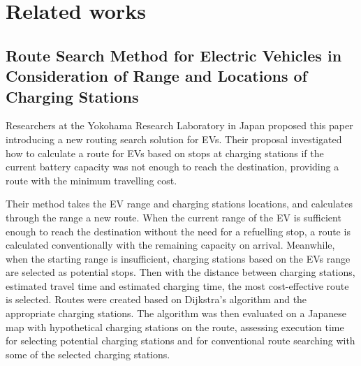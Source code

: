 \documentclass[11pt]{report}
\begin{document}
\section{Related works}

\subsection{Route Search Method for Electric Vehicles in Consideration of Range and Locations of Charging Stations \autocite{kobayashi2011route}}

Researchers at the Yokohama Research Laboratory in Japan proposed this paper introducing a new routing search solution for EVs. Their proposal investigated how to calculate a route for EVs based on stops at charging stations if the current battery capacity was not enough to reach the destination, providing a route with the minimum travelling cost.

Their method takes the EV range and charging stations locations, and calculates through the range a new route. When the current range of the EV is sufficient enough to reach the destination without the need for a refuelling stop, a route is calculated conventionally with the remaining capacity on arrival. Meanwhile, when the starting range is insufficient, charging stations based on the EVs range are selected as potential stops. Then with the distance between charging stations, estimated travel time and estimated charging time, the most cost-effective route is selected. Routes were created based on Dijkstra's algorithm and the appropriate charging stations. The algorithm was then evaluated on a Japanese map with hypothetical charging stations on the route, assessing execution time for selecting potential charging stations and for conventional route searching with some of the selected charging stations. 
\end{document}
